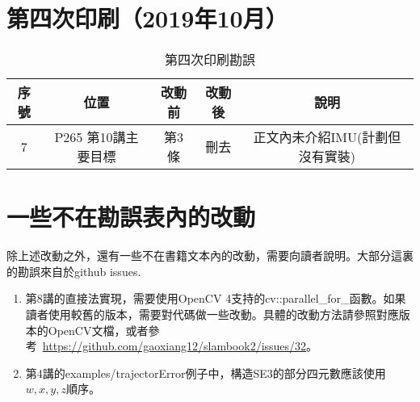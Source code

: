 \documentclass[lang=zh,11pt,numbers]{errata}
\begin{document}
\section{第四次印刷（2019年10月）}
\begin{table}[!htp]
	\centering
	\caption{第四次印刷勘誤}
	\begin{tabular}{c|cccc}
		\hline\hline
		序號 & 位置 & 改動前 & 改動後 & 說明 \\\hline
		7 & P265 第10講主要目標 & 第3條 & 刪去 & 正文內未介紹IMU(計劃但沒有實裝) \\
		\hline \hline
	\end{tabular}
\end{table}

\section{一些不在勘誤表內的改動}
除上述改動之外，還有一些不在書籍文本內的改動，需要向讀者說明。大部分這裏的勘誤來自於github issues.

\begin{enumerate}
	\item 第8講的直接法實現，需要使用OpenCV 4支持的cv::parallel\_for\_函數。如果讀者使用較舊的版本，需要對代碼做一些改動。具體的改動方法請參照對應版本的OpenCV文檔，或者參考~\url{https://github.com/gaoxiang12/slambook2/issues/32}。
	\item 第4講的examples/trajectorError例子中，構造SE3的部分四元數應該使用$w,x,y,z$順序。
\end{enumerate}
\end{document}
